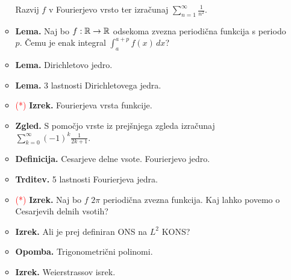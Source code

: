 \begin{enumerate}
\begin{itemize}
        Razvij \(f\) v Fourierjevo vrsto ter izračunaj \(\sum_{n=1}^{\infty} \frac{1}{n^2}\).
        \item \textbf{Lema.} Naj bo \(f: \mathbb{R} \to \mathbb{R}\) odsekoma zvezna periodična funkcija s periodo \(p\). Čemu je enak integral \(\int_{a}^{a+p} f(x) \, dx\)?
        \item \textbf{Lema.} Dirichletovo jedro.
        \item \textbf{Lema.} 3 lastnosti Dirichletovega jedra.
        \item \textcolor{red}{(*)} \textbf{Izrek.} Fourierjeva vrsta funkcije.
        \item \textbf{Zgled.} S pomočjo vrste iz prejšnjega zgleda izračunaj \(\sum_{k=0}^{\infty}(-1)^{k}\frac{1}{2k+1}\).
        \item \textbf{Definicija.} Cesarjeve delne vsote. Fourierjevo jedro.
        \item \textbf{Trditev.} 5 lastnosti Fourierjeva jedra.
        \item \textcolor{red}{(*)}  \textbf{Izrek.} Naj bo \(f\) \(2\pi\) periodična zvezna funkcija. Kaj lahko povemo o Cesarjevih delnih vsotih?
        \item \textbf{Izrek.} Ali je prej definiran ONS na \(L^2\) KONS?
        \item \textbf{Opomba.} Trigonometrični polinomi.
        \item \textbf{Izrek.} Weierstrassov isrek.
    \end{itemize}
\end{enumerate}